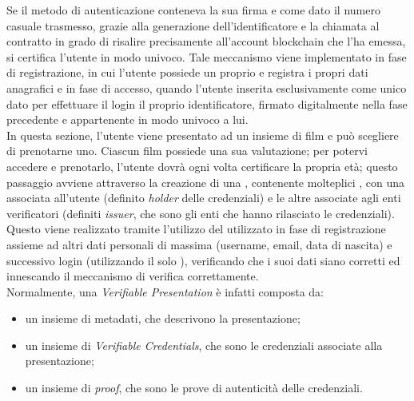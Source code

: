 Se il metodo di autenticazione conteneva la sua firma e come dato il numero casuale trasmesso, grazie alla generazione dell'identificatore
e la chiamata al contratto in grado di risalire precisamente all'account blockchain che l'ha emessa, si certifica l'utente in modo univoco.
Tale meccanismo viene implementato in fase di registrazione, in cui l'utente possiede un proprio  e registra i propri dati anagrafici
e in fase di accesso, quando l'utente inserita esclusivamente come unico dato per effettuare il login il proprio identificatore, firmato digitalmente nella fase precedente e appartenente in modo univoco a lui. \\

In questa sezione, l'utente viene presentato ad un insieme di film e può scegliere di prenotarne uno. Ciascun film possiede una sua valutazione;
per potervi accedere e prenotarlo, l'utente dovrà ogni volta certificare la propria età;
questo passaggio avviene attraverso la creazione di una , contenente molteplici , 
con una associata all'utente (definito \textit{holder} delle credenziali) e le altre associate agli enti verificatori (definiti \textit{issuer}, che sono gli enti che hanno rilasciato le credenziali).
Questo viene realizzato tramite l'utilizzo del  utilizzato in fase di registrazione assieme ad altri dati personali 
di massima (username, email, data di nascita) e successivo login (utilizzando il solo ), verificando che 
i suoi dati siano corretti ed innescando il meccanismo di verifica correttamente. \\

Normalmente, una \textit{Verifiable Presentation} è infatti composta da:
\begin{itemize}
    \item un insieme di metadati, che descrivono la presentazione;
    \item un insieme di \textit{Verifiable Credentials}, che sono le credenziali associate alla presentazione;
    \item un insieme di \textit{proof}, che sono le prove di autenticità delle credenziali.
\end{itemize}

